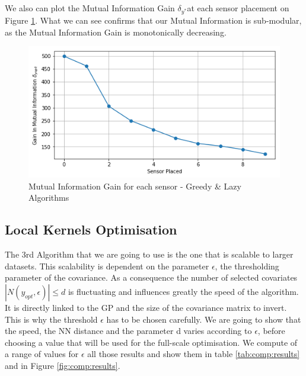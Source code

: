 We also can plot the Mutual Information Gain $\delta_{y^*}$at each sensor placement on Figure \ref{fig:compAlg:MIGAIN}. What we can see confirms that our Mutual Information is sub-modular, as the Mutual Information Gain is monotonically decreasing. 


\begin{figure}[h!]
\centering
\includegraphics[width=0.6\linewidth]{figures/CompAlg/3rd/non_centered_60.35.0/MIGain}
\caption{Mutual Information Gain for each sensor - Greedy \& Lazy Algorithms}
\label{fig:compAlg:MIGAIN}
\end{figure}


\subsection{Local Kernels Optimisation}

The 3rd Algorithm that we are going to use is the one that is scalable to larger datasets. This scalability is dependent on the parameter $\epsilon$, the thresholding parameter of the covariance. As a consequence the number of selected covariates  $|N(y_{opt},\epsilon)| \leq d $ is fluctuating and influences greatly the speed of the algorithm. It is directly linked to the GP and the size of the covariance matrix to invert.  \\ 

This is why the threshold $\epsilon$ has to be chosen carefully. We are going to show that the speed, the NN distance and the parameter d varies according to $\epsilon$, before choosing a value that will be used for the full-scale optimisation. We compute of a range of values for $\epsilon$ all those results and show them in table \ref{tab:comp:results} and in Figure \ref{fig:comp:results}. \\




